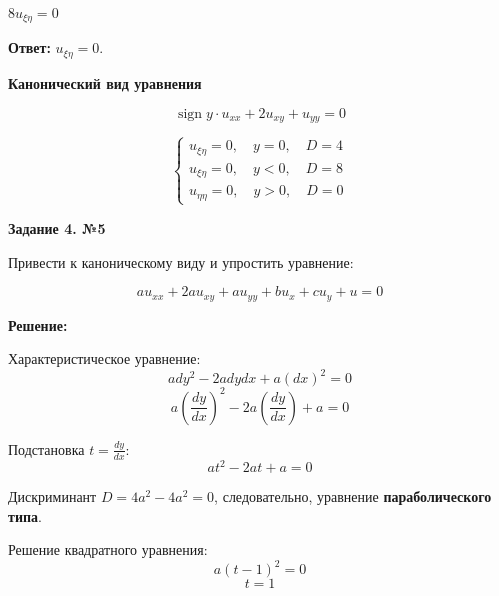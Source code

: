 \documentclass[a4paper,12pt]{article}
\begin{document}
$8u_{\xi\eta} = 0$

\textbf{Ответ:} $ u_{\xi\eta} = 0. $

\begin{center}
\noindent \textbf{Канонический вид уравнения}
\end{center}

\[
\operatorname{sign} y \cdot u_{xx} + 2 u_{xy} + u_{yy} = 0
\]

\begin{equation*}
    \begin{cases}
        u_{\xi\eta} = 0, \quad y = 0, \quad D = 4 \\
        u_{\xi\eta} = 0, \quad y < 0, \quad D = 8 \\
        u_{\eta\eta} = 0, \quad y > 0, \quad D = 0
    \end{cases}
\end{equation*}


\vspace{100mm}
\vspace{17mm}
\begin{center}    
\noindent \textbf{Задание 4. №5}
\end{center}
Привести к каноническому виду и упростить уравнение:

\begin{equation*}
    a u_{xx} + 2a u_{xy} + a u_{yy} + b u_x + c u_y + u = 0
\end{equation*}

\textbf{Решение:}

Характеристическое уравнение:
\begin{equation*}
    a dy^2 - 2a dy dx + a (dx)^2 = 0
\end{equation*}
\begin{equation*}
    a \left(\frac{dy}{dx}\right)^2 - 2a \left(\frac{dy}{dx}\right) + a = 0
\end{equation*}

Подстановка $t = \frac{dy}{dx}$:
\begin{equation*}
    a t^2 - 2a t + a = 0
\end{equation*}

Дискриминант $D = 4a^2 - 4a^2 = 0$, следовательно, уравнение \textbf{параболического типа}.

Решение квадратного уравнения:
\begin{equation*}
    a (t - 1)^2 = 0
\end{equation*}
\begin{equation*}
    t = 1
\end{equation*}
\end{document}
